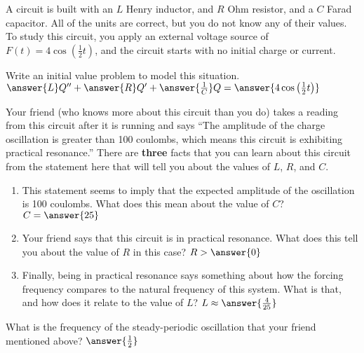 \documentclass{ximera}
\begin{document}
\begin{exercise}
    A circuit is built with an $L$ Henry inductor, and $R$ Ohm resistor, and a $C$ Farad capacitor. All of the units are correct, but you do not know any of their values. To study this circuit, you apply an external voltage source of $F(t) = 4 \cos\left(\frac{1}{2} t \right)$, and the circuit starts with no initial charge or current.
    
    Write an initial value problem to model this situation. $\answer{L}Q'' + \answer{R}Q' + \answer{\frac{1}{C}}Q = \answer{4\cos\left(\frac{1}{2}t\right)}$
    \begin{problem}
        Your friend (who knows more about this circuit than you do) takes a reading from this circuit after it is running and says ``The amplitude of the charge oscillation is greater than 100 coulombs, which means this circuit is exhibiting practical resonance.'' There are \textbf{three} facts that you can learn about this circuit from the statement here that will tell you about the values of $L$, $R$, and $C$. 
        \begin{enumerate}
            \item This statement seems to imply that the expected amplitude of the oscillation is 100 coulombs. What does this mean about the value of $C$? $C = \answer{25}$
            \item Your friend says that this circuit is in practical resonance. What does this tell you about the value of $R$ in this case? $R > \answer{0}$
            \item Finally, being in practical resonance says something about how the forcing frequency compares to the natural frequency of this system. What is that, and how does it relate to the value of $L$? $L \approx \answer{\frac{4}{25}}$
        \end{enumerate}
        \begin{problem}
            What is the frequency of the steady-periodic oscillation that your friend mentioned above? $\answer{\frac{1}{2}}$
        \end{problem}
    \end{problem}
\end{exercise}


\end{document}
